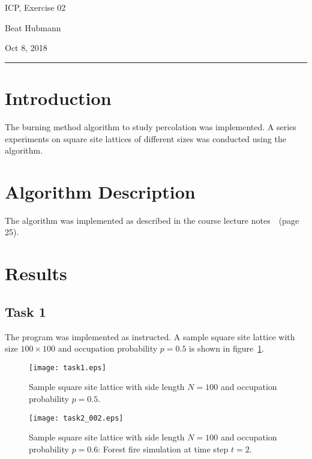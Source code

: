 \documentclass[11pt,a4paper]{article}
\begin{document}
\noindent\parbox{\linewidth}{
 \parbox{.25\linewidth}{ \large ICP, Exercise 02 }\hfill
 \parbox{.5\linewidth}{\begin{center} \large Beat Hubmann \end{center}}\hfill
 \parbox{.2\linewidth}{\begin{flushright} \large Oct 8, 2018 \end{flushright}}
}
\noindent\rule{\linewidth}{2pt}


\section{Introduction}

The burning method algorithm to study percolation was implemented. A series experiments on square site lattices of different sizes was conducted using the algorithm.

\section{Algorithm Description}
The algorithm was implemented as described in the course lecture notes~\cite{herrmann}~(page 25).

\section{Results}

\subsection{Task 1}

The program was implemented as instructed. A sample square site lattice with size $100 \times 100$ and occupation probability $p = 0.5$ is shown in figure~\ref{fig1}.


\begin{figure}[ht]
\begin{center}
\texttt{[image: task1.eps]} 
\end{center}
\caption{Sample square site lattice with side length $N = 100$ and occupation probability $p=0.5$.}
\label{fig1}
\end{figure}

\begin{figure}[ht]
\begin{center}
\texttt{[image: task2\_002.eps]} 
\end{center}
\caption{Sample square site lattice with side length $N = 100$ and occupation probability $p=0.6$: Forest fire simulation at time step $t=2$.}
\label{fig2_1}
\end{figure}
\end{document}
